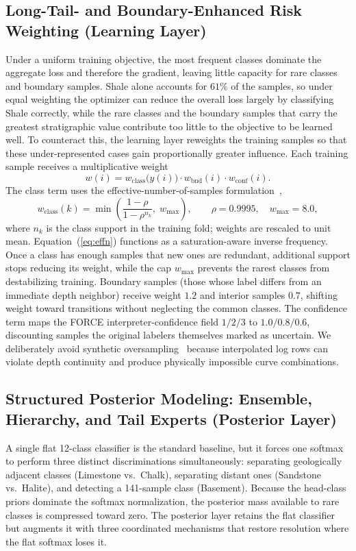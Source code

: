 \documentclass[bdcc,article,submit,pdftex,moreauthors]{Definitions/mdpi}
\begin{document}
\subsection{Long-Tail- and Boundary-Enhanced Risk Weighting (Learning Layer)}
\label{sec:learning}
Under a uniform training objective, the most frequent classes dominate the aggregate loss and
therefore the gradient, leaving little capacity for rare classes and boundary samples. Shale
alone accounts for $61\%$ of the samples, so under equal weighting the optimizer can reduce the
overall loss largely by classifying Shale correctly, while the rare classes and the boundary
samples that carry the greatest stratigraphic value contribute too little to the objective to
be learned well. To counteract this, the learning layer reweights the training samples so that
these under-represented cases gain proportionally greater influence. Each training sample
receives a multiplicative weight
\begin{equation}
w(i) = w_\text{class}\!\bigl(y(i)\bigr)\cdot w_\text{bnd}(i)\cdot w_\text{conf}(i).
\label{eq:weight}
\end{equation}
The class term uses the effective-number-of-samples
formulation~\cite{cui2019classbalanced},
\begin{equation}
w_\text{class}(k) = \min\!\left(\frac{1-\rho}{1-\rho^{n_k}},\; w_\text{max}\right),\qquad \rho=0.9995,\quad w_\text{max}=8.0,
\label{eq:effn}
\end{equation}
where $n_k$ is the class support in the training fold; weights are rescaled to unit mean.
Equation~(\ref{eq:effn}) functions as a saturation-aware inverse frequency. Once a class has
enough samples that new ones are redundant, additional support stops reducing its weight,
while the cap $w_\text{max}$ prevents the rarest classes from destabilizing training.
Boundary samples (those whose label differs from an immediate depth neighbor) receive weight
$1.2$ and interior samples $0.7$, shifting weight toward transitions without neglecting the
common classes. The confidence term maps the FORCE interpreter-confidence field
$1/2/3$ to $1.0/0.8/0.6$, discounting samples the original labelers themselves marked as
uncertain. We deliberately avoid synthetic oversampling~\cite{chawla2002smote} because interpolated
log rows can violate depth continuity and produce physically impossible curve combinations.

\subsection{Structured Posterior Modeling: Ensemble, Hierarchy, and Tail Experts (Posterior Layer)}
\label{sec:posterior}
A single flat 12-class classifier is the standard baseline, but it forces one softmax to
perform three distinct discriminations simultaneously: separating geologically adjacent classes
(Limestone vs.\ Chalk), separating distant ones (Sandstone vs.\ Halite), and detecting a
141-sample class (Basement). Because the head-class priors dominate the softmax normalization,
the posterior mass available to rare classes is compressed toward zero. The posterior layer
retains the flat classifier but augments it with three coordinated mechanisms that restore
resolution where the flat softmax loses it.
\end{document}
